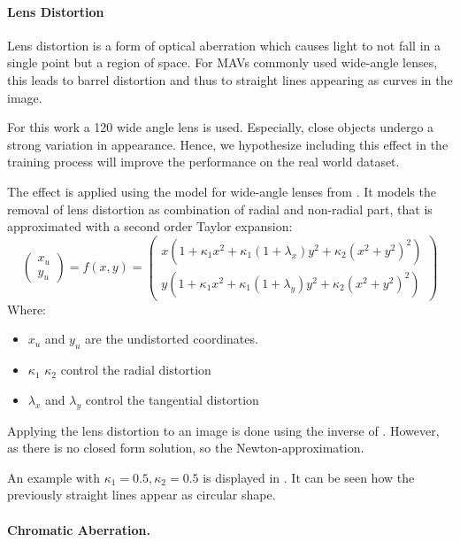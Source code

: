 \paragraph{Lens Distortion}

Lens distortion is a form of optical aberration which causes light to not fall in a single point but a region of space. For \acp{MAV} commonly used wide-angle lenses, this leads to barrel distortion and thus to straight lines appearing as curves in the image.

For this work a 120 wide angle lens is used. Especially, close objects undergo a strong variation in appearance. Hence, we hypothesize including this effect in the training process will improve the performance on the real world dataset. 

The effect is applied using the model for wide-angle lenses from \cite{Vass}. It models the removal of lens distortion as combination of radial and non-radial part, that is approximated with a second order Taylor expansion:
\begin{equation}
\begin{pmatrix}
x_u \\
y_u  
\end{pmatrix}=
f(x,y) =
\begin{pmatrix}
x (1 + \kappa_1 x^2 + \kappa_1 (1 + \lambda_x) y^2 + \kappa_2(x^2 + y^2)^2) \\
y (1 + \kappa_1 x^2 + \kappa_1 (1 + \lambda_y) y^2 + \kappa_2(x^2 + y^2)^2)
\end{pmatrix} 
\label{eq:distortion}
\end{equation}
Where:
\begin{itemize}
	\item $x_u$ and $y_u$ are the undistorted coordinates.
	\item $\kappa_1$ $\kappa_2$ control the radial distortion 
	\item $\lambda_x$ and $\lambda_y$ control the tangential distortion
\end{itemize}

Applying the lens distortion to an image is done using the inverse of . However, as there is no closed form solution, so the Newton-approximation.

An example with $\kappa_1 = 0.5, \kappa_2 = 0.5$ is displayed in . It can be seen how the previously straight lines appear as circular shape.

\paragraph{Chromatic Aberration.}


